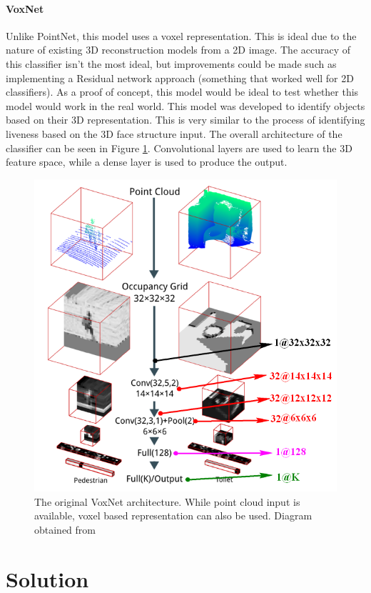 \documentclass[10pt,a4paper]{article}
\begin{document}
            \paragraph{VoxNet}
                Unlike PointNet, this model uses a voxel representation. This is ideal due to the nature of existing 3D reconstruction models from a 2D image. The accuracy of this classifier isn't the most ideal,
                but improvements could be made such as implementing a Residual network approach (something that worked well for 2D classifiers). As a proof of concept, this model would be ideal to test whether this model would work
                in the real world. This model was developed to identify objects based on their 3D representation.\cite{VoxNetModel} This is very similar to the process of identifying liveness based on the 3D face structure input.
                The overall architecture of the classifier can be seen in Figure \ref{OriginalVoxNetArchitecture}. Convolutional layers are used to learn the 3D feature space, while a dense layer is used to produce the output. 
                \begin{figure}[]
                    \centering
                    \includegraphics[width=0.5\linewidth]{VoxNetArchitecture.png}
                    \caption{The original VoxNet architecture. While point cloud input is available, voxel based representation can also be used. Diagram obtained from \cite{VoxNetModel}}
                    \label{OriginalVoxNetArchitecture}
                \end{figure}
\section{Solution}
\end{document}
